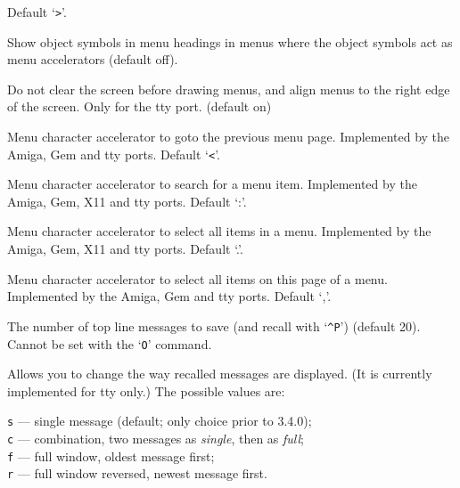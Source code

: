Default `\verb+>+'.
\item[\ib{menu\verb+_+objsyms}]
Show object symbols in menu headings in menus where
the object symbols act as menu accelerators (default off).
\item[\ib{menu\verb+_+overlay}]
Do not clear the screen before drawing menus, and align
menus to the right edge of the screen. Only for the tty port.
(default on)
\item[\ib{menu\verb+_+previous\verb+_+page}]
Menu character accelerator to goto the previous menu page.
Implemented by the Amiga, Gem and tty ports.
Default `\verb+<+'.
\item[\ib{menu\verb+_+search}]
Menu character accelerator to search for a menu item.
Implemented by the Amiga, Gem, X11 and tty ports.
Default `:'.
\item[\ib{menu\verb+_+select\verb+_+all}]
Menu character accelerator to select all items in a menu.
Implemented by the Amiga, Gem, X11 and tty ports.
Default `.'.
\item[\ib{menu\verb+_+select\verb+_+page}]
Menu character accelerator to select all items on this page of a menu.
Implemented by the Amiga, Gem and tty ports.
Default `,'.
\item[\ib{msghistory}]
The number of top line messages to save (and recall with `{\tt \^{}P}')
(default 20). Cannot be set with the `{\tt O}' command.
\item[\ib{msg\verb+_+window}]
Allows you to change the way recalled messages are displayed.
(It is currently implemented for tty only.) The possible values are:

{\tt s} --- single message (default; only choice prior to 3.4.0);\\
{\tt c} --- combination, two messages as {\it single\/}, then as {\it full\/};\\
{\tt f} --- full window, oldest message first;\\
{\tt r} --- full window reversed, newest message first.


